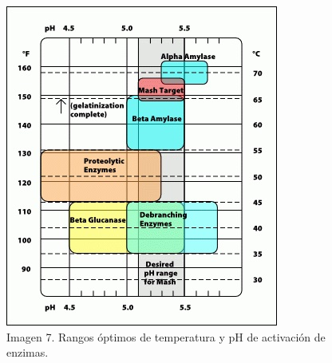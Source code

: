         \begin{figure}[ht]		                                                           \centerline{\includegraphics[scale=1]{activacion_enzimas_t_ph.jpg}}
            \caption{Imagen 7. Rangos óptimos de temperatura y pH de activación de enzimas. \cite{Palmer}}
            \label{ActivacionEnzimasTpH}
        \end{figure}
        
